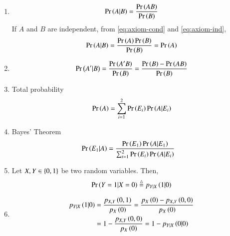 \begin{enumerate}[label=\thesubsection.\arabic*,ref=\thesubsection.\theenumi]
\item 
\begin{align}
	\pr{A | B} = \frac{\pr{AB}}{\pr{B}}
\label{eq:axiom-cond}
\end{align}
If $A$ and $B$ are independent, from 
\eqref{eq:axiom-cond}
and 
\eqref{eq:axiom-ind},
\begin{align}
	\pr{A | B} = \frac{\pr{A}\pr{B}}{\pr{B}}={\pr{A}}
\label{eq:axiom-cond-ind}
\end{align}
\item 
\begin{align}
	\pr{A' | B} = \frac{\pr{A'B}}{\pr{B}} = \frac{\pr{B}-\pr{AB}}{\pr{B}}
\label{eq:axiom-cond-prime}
\end{align}
\item Total probability
	\begin{align}
		\pr{A} = \sum_{i=1}^{2}\pr{E_i}\pr{A|E_i}
\label{eq:axiom-tot-prob}
\end{align}
\item Bayes' Theorem
\begin{align}
	\pr{E_1|A} &= \frac{\pr{E_1}\pr{A|E_1}}{\sum_{i=1}^{2}\pr{E_i}\pr{A|E_i}}
\label{eq:axiom-bayes}
\end{align}
\item Let $X, Y \in \left\{0,1\right\}$ be two random variables.  Then, 
\begin{align}
	\label{eq:12/13/3/43/yixj-def}
	  \pr{Y=1|X=0}\triangleq  p_{Y|X}\brak{1|0}
\end{align}
\item 
\begin{align}
	   p_{Y|X}\brak{1|0}
	   &=
	   \frac{p_{X,Y}\brak{0,1}}{p_{X}\brak{0}}
	   =
	   \frac{p_{X}\brak{0}-p_{X,Y}\brak{0,0}}{p_{X}\brak{0}}
	   \\
	   &=
	   1-\frac{p_{X,Y}\brak{0,0}}{p_{X}\brak{0}} = 1-p_{Y|X}\brak{0|0}
	\label{eq:12/13/3/43/yixj}
\end{align}
\end{enumerate}
